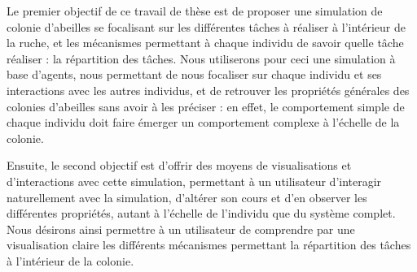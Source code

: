 	Le premier objectif de ce travail de thèse est de proposer une simulation de colonie d'abeilles se focalisant sur les différentes tâches à réaliser à l'intérieur de la ruche, et les mécanismes permettant à chaque individu de savoir quelle tâche réaliser : la répartition des tâches. Nous utiliserons pour ceci une simulation à base d'agents, nous permettant de nous focaliser sur chaque individu et ses interactions avec les autres individus, et de retrouver les propriétés générales des colonies d'abeilles sans avoir à les préciser : en effet, le comportement simple de chaque individu doit faire émerger un comportement complexe à l'échelle de la colonie. 
	
	Ensuite, le second objectif est d'offrir des moyens de visualisations et d'interactions avec cette simulation, permettant à un utilisateur d'interagir naturellement avec la simulation, d'altérer son cours et d'en observer les différentes propriétés, autant à l'échelle de l'individu que du système complet. Nous désirons ainsi permettre à un utilisateur de comprendre par une visualisation claire les différents mécanismes permettant la répartition des tâches à l'intérieur de la colonie.
	
